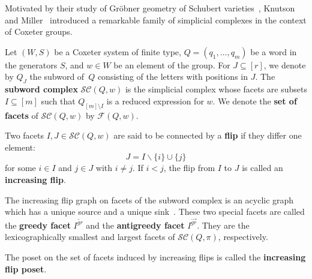 \documentclass{amsart}
\theoremstyle{definition}
\newcommand{\defn}[1]{\textbf{\textsf{\color{PineGreen} #1}}} %
\newcommand{\subwordComplex}{\mathcal{SC}} %
\newcommand{\subwordFacets}{\mathcal{F}} %
\newcommand{\greedyFacet}{I^{\overleftarrow{gr}}} %
\newcommand{\antiGreedyFacet}{I^{\overrightarrow{gr}}} %
\begin{document}
Motivated by their study of Gröbner geometry of Schubert varieties~\cite{KnutsonMiller-GroebnerGeometry}, Knutson and Miller~\cite{knutson_subword_2004} introduced a remarkable family of simplicial complexes in the context of Coxeter groups. 

Let $(W,S)$ be a Coxeter system of finite type, $Q=(q_1,\dots,q_m)$ be a word in the generators $S$, and $w\in W$ be an element of the group. 
For $J\subseteq [r]$, we denote by $Q_J$ the subword of~$Q$ consisting of the letters with positions in $J$. 
The \defn{subword complex} $\subwordComplex(Q,w)$ is the simplicial complex whose facets are subsets $I\subseteq [m]$ such that $Q_{[m]\setminus I}$ is a reduced expression for $w$. 
We denote the \defn{set of facets} of $\subwordComplex(Q,w)$ by $\subwordFacets(Q,w)$.

Two facets $I,J\in\subwordComplex(Q,w)$ are said to be connected by a \defn{flip} if they differ one element:
\[J=I\smallsetminus \{i\} \cup\{j\}\]
for some $i\in I$ and $j\in J$ with $i\neq j$. If $i<j$, the flip from $I$ to $J$ is called an \defn{increasing flip}. 

The increasing flip graph on facets of the subword complex is an acyclic graph which has a unique source and a unique sink~\cite{pilaud_greedy_2012,pilaud_el_labelling_2013}.
These two special facets are called the \defn{greedy facet} $\greedyFacet$ and the \defn{antigreedy facet} $\antiGreedyFacet$. They are the lexicographically smallest and largest facets of $\subwordComplex(Q,\pi)$, respectively. 

The poset on the set of facets induced by increasing flips is called the \defn{increasing flip poset}.
\end{document}
